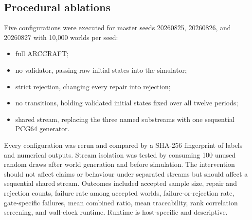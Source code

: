 \subsection{Procedural ablations}\label{sec:procedural-ablations}

Five configurations were executed for master seeds 20260825, 20260826, and 20260827 with 10,000 worlds per seed:

\begin{itemize}[leftmargin=*]
\item full ARCCRAFT;
\item no validator, passing raw initial states into the simulator;
\item strict rejection, changing every repair into rejection;
\item no transitions, holding validated initial states fixed over all twelve periods;
\item shared stream, replacing the three named substreams with one sequential PCG64 generator.
\end{itemize}

Every configuration was rerun and compared by a SHA-256 fingerprint of labels and numerical outputs. Stream isolation was tested by consuming 100 unused random draws after world generation and before simulation. The intervention should not affect claims or behaviour under separated streams but should affect a sequential shared stream. Outcomes included accepted sample size, repair and rejection counts, failure rate among accepted worlds, failure-or-rejection rate, gate-specific failures, mean combined ratio, mean traceability, rank correlation screening, and wall-clock runtime. Runtime is host-specific and descriptive.
